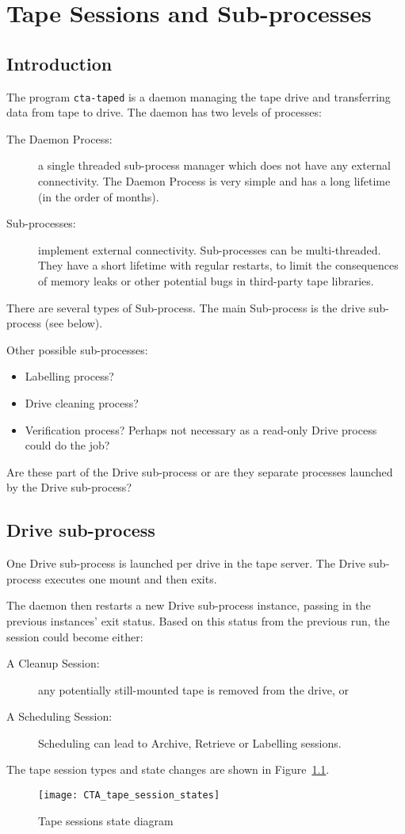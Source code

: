 \chapter{Tape Sessions and Sub-processes}

\section{Introduction}

The program {\tt cta-taped} is a daemon managing the tape drive and transferring data from tape to drive. The daemon has
two levels of processes:
\begin{description}
\item[The Daemon Process:] a single threaded sub-process manager which does not have any external connectivity. The
Daemon Process is very simple and has a long lifetime (in the order of months).
\item[Sub-processes:] implement external connectivity. Sub-processes can be multi-threaded. They have a short lifetime
with regular restarts, to limit the consequences of memory leaks or other potential bugs in third-party tape libraries.
\end{description}

There are several types of Sub-process. The main Sub-process is the drive sub-process (see below).

\begin{alertbox}
Other possible sub-processes:
\begin{itemize}
\item Labelling process?
\item Drive cleaning process?
\item Verification process? Perhaps not necessary as a read-only Drive process could do the job?
\end{itemize}
Are these part of the Drive sub-process or are they separate processes launched by the Drive sub-process?
\end{alertbox}

\clearpage

\section{Drive sub-process}

One Drive sub-process is launched per drive in the tape server. The Drive sub-process executes one mount and then exits.

The daemon then restarts a new Drive sub-process instance, passing in the previous instances' exit status. Based on this
status from the previous run, the session could become either:
\begin{description}
\item[A Cleanup Session:] any potentially still-mounted tape is removed from the drive, or
\item[A Scheduling Session:] Scheduling can lead to Archive, Retrieve or Labelling sessions.
\end{description}

The tape session types and state changes are shown in Figure~\ref{statediag}.

\begin{figure}[h!]
\centering
\texttt{[image: CTA\_tape\_session\_states]}
\caption{Tape sessions state diagram}
\label{statediag}
\end{figure}

